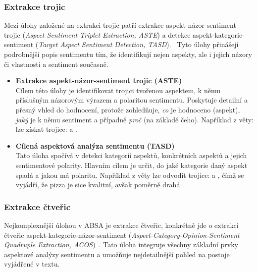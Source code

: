 \subsubsection{Extrakce trojic}
Mezi úlohy založené na extrakci trojic patří extrakce aspekt-názor-sentiment trojic (\emph{Aspect Sentiment Triplet Extraction, ASTE}) a detekce aspekt-kategorie-sentiment (\emph{Target Aspect Sentiment Detection, TASD}).~\cite{MAO2024102048} Tyto úlohy přinášejí podrobnější popis sentimentu tím, že identifikují nejen aspekty, ale i jejich názory či vlastnosti a sentiment současně.

\begin{itemize}
    \item \textbf{Extrakce aspekt-názor-sentiment trojic (ASTE)} \\
    Cílem této úlohy je identifikovat trojici tvořenou aspektem, k němu příslušným názorovým výrazem a polaritou sentimentu. Poskytuje detailní a přesný vhled do hodnocení, protože zohledňuje, \emph{co} je hodnoceno (aspekt), \emph{jaký} je k němu sentiment a případně \emph{proč} (na základě čeho). Například z věty:  lze získat trojice:  a .~\cite{MAO2024102048, Peng_Xu_Bing_Huang_Lu_Si_2020}

    \item \textbf{Cílená aspektová analýza sentimentu (TASD)} \\
    Tato úloha spočívá v detekci kategorií aspektů, konkrétních aspektů a jejich sentimentové polarity. Hlavním cílem je určit, do jaké kategorie daný aspekt spadá a jakou má polaritu. Například z věty  lze odvodit trojice:  a , čímž se vyjádří, že pizza je sice kvalitní, avšak poměrně drahá.~\cite{Wan_Yang_Du_Liu_Qi_Pan_2020, Ke2023}
\end{itemize}

\subsubsection{Extrakce čtveřic}
Nejkomplexnější úlohou v ABSA je extrakce čtveřic, konkrétně jde o extrakci čtveřic aspekt-kategorie-názor-sentiment (\emph{Aspect-Category-Opinion-Sentiment Quadruple Extraction, ACOS})~\cite{MAO2024102048}. Tato úloha integruje všechny základní prvky aspektové analýzy sentimentu a umožňuje nejdetailnější pohled na postoje vyjádřené v textu.

